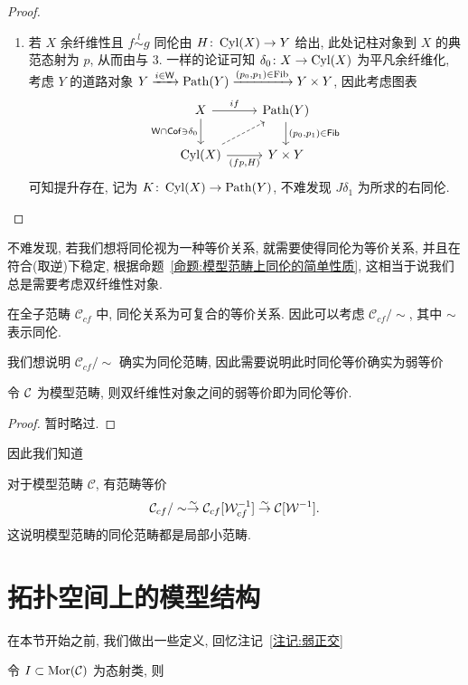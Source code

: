 \begin{proof}
\begin{enumerate}
        \item 若 $X$ 余纤维性且 $f \overset{l}{\sim} g$ 同伦由 $H \colon \operatorname{Cyl}(X) \to Y$ 给出, 此处记柱对象到 $X$ 的典范态射为 $p$, 从而由与 3. 一样的论证可知 $\delta_0 \colon X \to \operatorname{Cyl}(X)$ 为平凡余纤维化, 考虑 $Y$ 的道路对象 $Y \xrightarrow{i\in \mathsf{W}} \operatorname{Path}(Y) \xrightarrow{(p_0,p_1) \in \operatorname{Fib}}Y \times Y$, 因此考虑图表
        \[\begin{tikzcd}
	X & {\Path(Y)} \\
	{\Cyl(X)} & {Y\times Y}
	\arrow["if", from=1-1, to=1-2]
	\arrow["{\cate{W}\cap\Cof\ni \delta_0}"', from=1-1, to=2-1]
	\arrow["{(p_0,p_1)\in \cate{Fib}}", from=1-2, to=2-2]
	\arrow[dashed, from=2-1, to=1-2]
	\arrow["{(fp,H)}"', from=2-1, to=2-2]
        \end{tikzcd}\]
        可知提升存在, 记为 $K \colon \operatorname{Cyl}(X) \to \operatorname{Path}(Y)$, 不难发现 $J\delta_1$ 为所求的右同伦.
    \end{enumerate}
\end{proof}
不难发现, 若我们想将同伦视为一种等价关系, 就需要使得同伦为等价关系, 并且在符合(取逆)下稳定, 根据命题~\ref{命题:模型范畴上同伦的简单性质}, 这相当于说我们总是需要考虑双纤维性对象.
\begin{corollary}
    在全子范畴 $\mathcal{C}_{cf}$ 中, 同伦关系为可复合的等价关系. 因此可以考虑 $\mathcal{C}_{cf}/\sim$, 其中 $\sim$ 表示同伦.
\end{corollary}
我们想说明 $\mathcal{C}_{cf}/\sim$ 确实为同伦范畴, 因此需要说明此时同伦等价确实为弱等价
\begin{theorem}[Whitehead]\label{定理:模型范畴的白头定理}
    令 $\cal{C}$ 为模型范畴, 则双纤维性对象之间的弱等价即为同伦等价.
\end{theorem}
\begin{proof}
    暂时略过.
\end{proof}
因此我们知道
\begin{theorem}\label{定理:模型范畴给出局部小的同伦范畴}
    对于模型范畴 $\mathcal{C}$, 有范畴等价 
    \[
    \mathcal{C}_{cf}/\sim \stackrel{\sim}{\rightarrow} \mathcal{C}_{cf}[\mathcal{W}_{cf}^{-1}]\stackrel{\sim}{\rightarrow} \mathcal{C}[\mathcal{W}^{-1}].
    \]
    这说明模型范畴的同伦范畴都是局部小范畴.
\end{theorem}
\section{拓扑空间上的模型结构}
在本节开始之前, 我们做出一些定义, 回忆注记~\ref{注记:弱正交}
\begin{definition}[术语]
    令 $I \subset \operatorname{Mor}(\cal{C})$ 为态射类, 则
\end{definition}

